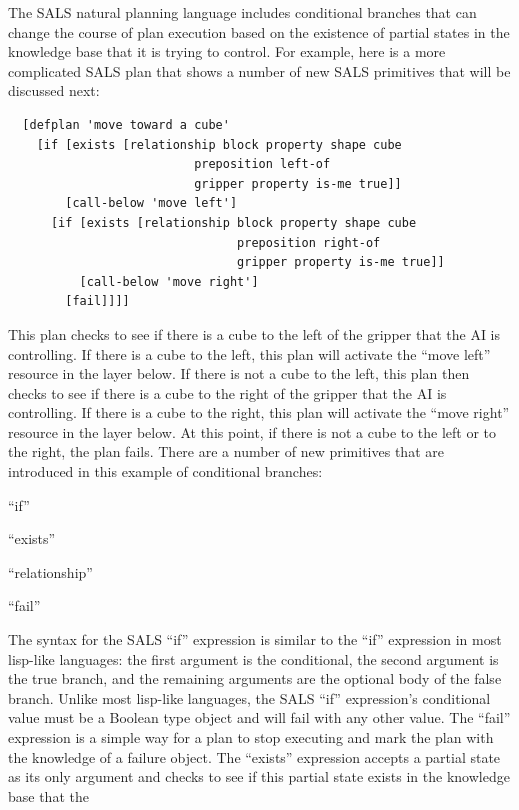 The SALS natural planning language includes conditional branches that
can change the course of plan execution based on the existence of
partial states in the knowledge base that it is trying to control.
For example, here is a more complicated SALS plan that shows a number
of new SALS primitives that will be discussed next:
\begin{samepage}
\begin{Verbatim}
  [defplan 'move toward a cube'
    [if [exists [relationship block property shape cube
	                      preposition left-of
	                      gripper property is-me true]]
        [call-below 'move left']
      [if [exists [relationship block property shape cube
                                preposition right-of
                                gripper property is-me true]]
          [call-below 'move right']
        [fail]]]]
\end{Verbatim}
\end{samepage}
This plan checks to see if there is a cube to the left of the gripper
that the AI is controlling.  If there is a cube to the left, this plan
will activate the ``move left'' resource in the layer below.  If there
is not a cube to the left, this plan then checks to see if there is a
cube to the right of the gripper that the AI is controlling.  If there
is a cube to the right, this plan will activate the ``move right''
resource in the layer below.  At this point, if there is not a cube to
the left or to the right, the plan fails.  There are a number of new
primitives that are introduced in this example of conditional
branches:
\begin{packed_itemize}
\item{``if''}
\item{``exists''}
\item{``relationship''}
\item{``fail''}
\end{packed_itemize}
The syntax for the SALS ``if'' expression is similar to the ``if''
expression in most lisp-like languages: the first argument is the
conditional, the second argument is the true branch, and the remaining
arguments are the optional body of the false branch.  Unlike most
lisp-like languages, the SALS ``if'' expression's conditional value
must be a Boolean type object and will fail with any other value.  The
``fail'' expression is a simple way for a plan to stop executing and
mark the plan with the knowledge of a failure object.  The ``exists''
expression accepts a partial state as its only argument and checks to
see if this partial state exists in the knowledge base that the
